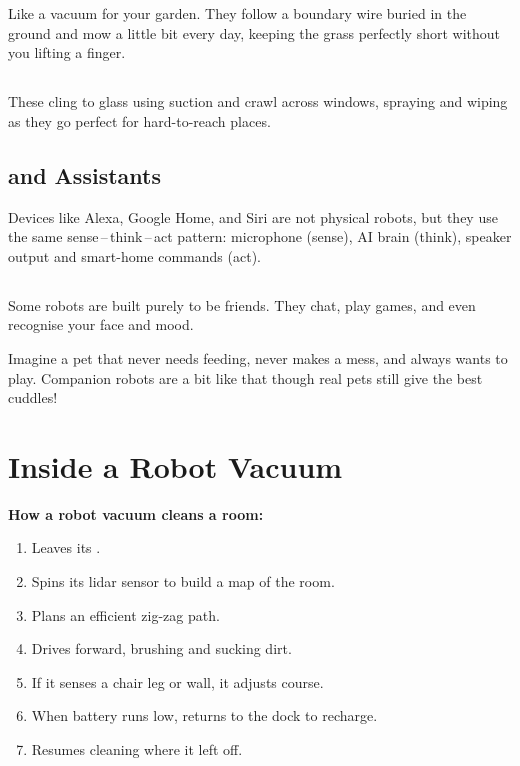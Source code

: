 Like a vacuum for your garden. They follow a boundary wire buried in the
ground and mow a little bit every day, keeping the grass perfectly short
without you lifting a finger.

\subsection*{}

These cling to glass using suction and crawl across windows, spraying and
wiping as they go \textemdash{} perfect for hard-to-reach places.

\subsection*{ and Assistants}

Devices like Alexa, Google Home, and Siri are not physical robots, but
they use the same sense\,--\,think\,--\,act pattern: microphone (sense),
AI brain (think), speaker output and smart-home commands (act).

\subsection*{}

Some robots are built purely to be friends. They chat, play games,
and even recognise your face and mood.

\begin{picturethis}
  Imagine a pet that never needs feeding, never makes a mess, and
  always wants to play. Companion robots are a bit like that \textemdash{}
  though real pets still give the best cuddles!
\end{picturethis}

\sectionrule

\section*{Inside a Robot Vacuum}

\begin{quickmap}
  \textbf{How a robot vacuum cleans a room:}
  \begin{enumerate}
    \item Leaves its .
    \item Spins its lidar sensor to build a map of the room.
    \item Plans an efficient zig-zag path.
    \item Drives forward, brushing and sucking dirt.
    \item If it senses a chair leg or wall, it adjusts course.
    \item When battery runs low, returns to the dock to recharge.
    \item Resumes cleaning where it left off.
  \end{enumerate}
\end{quickmap}

